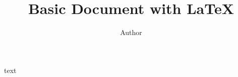 \documentclass[letterpaper, 12pt]{article}
\begin{document}
\title{Basic Document with {\LaTeX}}
\author{Author}
\date{}
\maketitle

text
\end{document}
